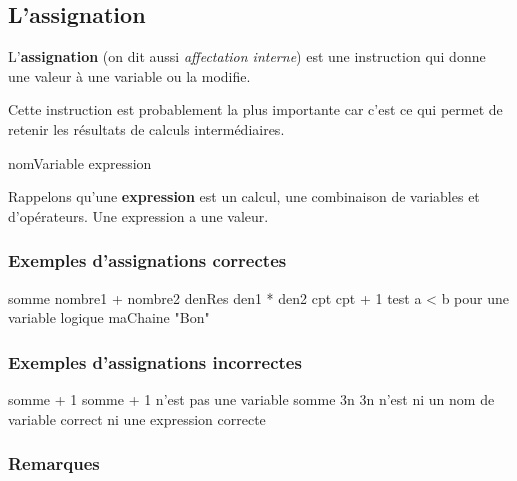 		\subsection{L'assignation}
	
			L'\textbf{assignation} 
			(on dit aussi \emph{affectation interne})
			est une instruction qui donne une valeur 
			à une variable ou la modifie.
	
			Cette instruction est probablement la plus importante
			car c'est ce qui permet de retenir les résultats 
			de calculs intermédiaires.
			
			\begin{LDA}
			\Let nomVariable \Gets expression
			\end{LDA}
				
			Rappelons qu’une \textbf{expression} 
			est un calcul, une combinaison de variables et
			d’opérateurs. Une expression a une valeur.
					
			\subsubsection{Exemples d'assignations correctes}
				
				\begin{LDA}
				\Let somme \Gets nombre1 + nombre2
				\Let denRes \Gets den1 * den2
				\Let cpt \Gets cpt + 1
				\Let test \Gets a < b \RComment pour une variable logique
				\Let maChaine \Gets "Bon"
				\end{LDA}
				
			\subsubsection{Exemples d'assignations incorrectes}
				
				\begin{LDA}
				\Let somme + 1 \Gets 3
				\RComment somme + 1 n’est pas une variable
				\Let somme \Gets 3n
				\RComment 3n n’est ni un nom de variable correct ni une expression correcte
				\end{LDA}
				
			\subsubsection{Remarques}
			

